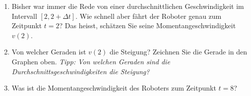 \begin{enumerate}
    \item Bisher war immer die Rede von einer durchschnittlichen Geschwindigkeit im Intervall $[2,2+\Delta t]$. Wie schnell aber fährt der Roboter genau zum Zeitpunkt $t=2$? Das heisst, schätzen Sie seine Momentangeschwindigkeit $v(2)$.
    \item Von welcher Geraden ist $v(2)$ die Steigung? Zeichnen Sie die Gerade in den Graphen oben. \textit{Tipp: Von welchen Geraden sind die Durchschnittsgeschwindigkeiten die Steigung?}
    \item Was ist die Momentangeschwindigkeit des Roboters zum Zeitpunkt $t=8$?
\end{enumerate}
\newpage

